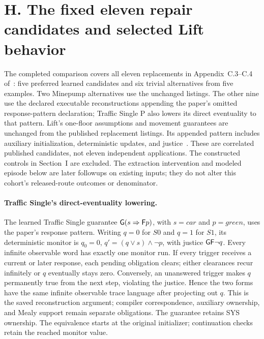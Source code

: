 \section*{H. The fixed eleven repair candidates and selected Lift behavior}
\label{supp:repair-eleven}
The completed comparison covers all eleven replacements in
Appendix~C.3--C.4 of~\cite{degradation}: five preferred learned candidates
and six trivial alternatives from five examples. Two Minepump alternatives
use the unchanged listings. The other nine use the declared executable
reconstructions appending the paper's omitted response-pattern declaration;
Traffic Single P also lowers its direct eventuality to that pattern.
Lift's one-floor assumptions and movement guarantees are unchanged from
the published replacement listings. Its appended pattern includes auxiliary
initialization, deterministic updates, and justice~\cite[Appendix C.2.1, C.3.3, and C.4.3]{degradation}.
These are correlated published candidates, not eleven independent
applications. The constructed controls in Section~I are excluded.
The extraction intervention and modeled episode below are later
followups on existing inputs; they do not alter this cohort's
released-route outcomes or denominator.

\paragraph{Traffic Single's direct-eventuality lowering.}
The learned Traffic Single guarantee $\mathsf{G}(s\Rightarrow\mathsf{F} p)$, with
$s=\mathit{car}$ and $p=\mathit{green}$, uses the paper's response pattern.
Writing $q=0$ for $S0$ and $q=1$ for $S1$, its deterministic monitor is
$q_0=0$, $q'=(q\lor s)\land\neg p$, with justice $\mathsf{G}\mathsf{F}\neg q$.
Every infinite observable word has exactly one monitor run.
If every trigger receives a current or later response, each pending
obligation clears; either clearances recur infinitely or $q$ eventually
stays zero. Conversely, an unanswered trigger makes $q$ permanently
true from the next step, violating the justice.
Hence the two forms have the same infinite observable trace language
after projecting out $q$. This is the saved reconstruction argument;
compiler correspondence, auxiliary ownership, and Mealy support remain
separate obligations. The guarantee retains SYS ownership.
The equivalence starts at the original initializer; continuation checks
retain the reached monitor value.

